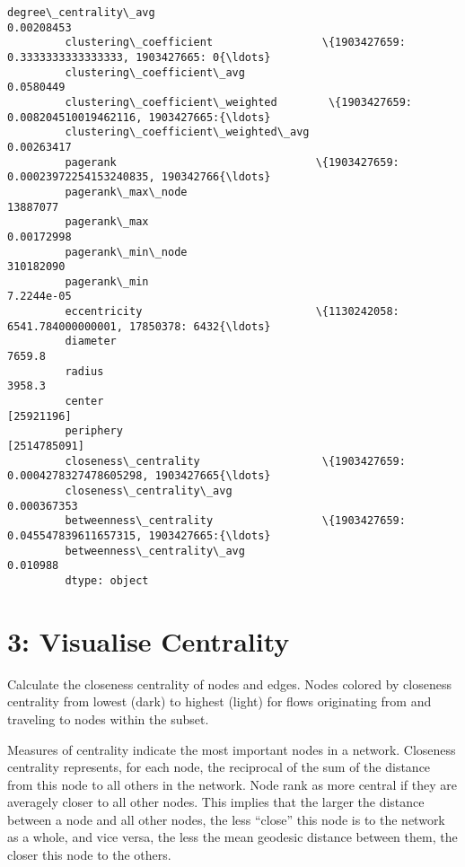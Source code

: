 \documentclass[11pt]{article}
\begin{document}
\begin{Verbatim}[commandchars=\\\{\}]
         degree\_centrality\_avg                                                         0.00208453
         clustering\_coefficient                 \{1903427659: 0.3333333333333333, 1903427665: 0{\ldots}
         clustering\_coefficient\_avg                                                     0.0580449
         clustering\_coefficient\_weighted        \{1903427659: 0.008204510019462116, 1903427665:{\ldots}
         clustering\_coefficient\_weighted\_avg                                           0.00263417
         pagerank                               \{1903427659: 0.00023972254153240835, 190342766{\ldots}
         pagerank\_max\_node                                                               13887077
         pagerank\_max                                                                  0.00172998
         pagerank\_min\_node                                                              310182090
         pagerank\_min                                                                  7.2244e-05
         eccentricity                           \{1130242058: 6541.784000000001, 17850378: 6432{\ldots}
         diameter                                                                          7659.8
         radius                                                                            3958.3
         center                                                                        [25921196]
         periphery                                                                   [2514785091]
         closeness\_centrality                   \{1903427659: 0.0004278327478605298, 1903427665{\ldots}
         closeness\_centrality\_avg                                                     0.000367353
         betweenness\_centrality                 \{1903427659: 0.045547839611657315, 1903427665:{\ldots}
         betweenness\_centrality\_avg                                                      0.010988
         dtype: object
\end{Verbatim}
            
    \section{3: Visualise Centrality}\label{visualise-centrality}

    Calculate the closeness centrality of nodes and edges. Nodes colored by
closeness centrality from lowest (dark) to highest (light) for flows
originating from and traveling to nodes within the subset.

Measures of centrality indicate the most important nodes in a network.
Closeness centrality represents, for each node, the reciprocal of the
sum of the distance from this node to all others in the network. Node
rank as more central if they are averagely closer to all other nodes.
This implies that the larger the distance between a node and all other
nodes, the less ``close'' this node is to the network as a whole, and
vice versa, the less the mean geodesic distance between them, the closer
this node to the others.
\end{document}
